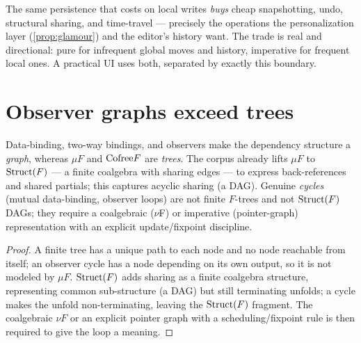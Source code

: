 \documentclass[../uxoxo-main]{subfiles}
\begin{document}
\begin{remark}\label{rem:valuewins}
The same persistence that costs on local writes \emph{buys} cheap snapshotting,
undo, structural sharing, and time-travel --- precisely the operations the
personalization layer (\cref{prop:glamour}) and the editor's history want. The
trade is real and directional: pure for infrequent global moves and history,
imperative for frequent local ones. A practical UI uses both, separated by exactly
this boundary.
\end{remark}

\section{Observer graphs exceed trees}\label{sec:graphs}
\begin{proposition}\label{prop:graphs}
Data-binding, two-way bindings, and observers make the dependency structure a
\emph{graph}, whereas $\mu F$ and $\mathrm{Cofree} F$ are \emph{trees}. The corpus already
lifts $\mu F$ to $\mathrm{Struct}(F)$ --- a finite coalgebra with sharing edges --- to
express back-references and shared partials; this captures acyclic sharing
(a DAG). Genuine \emph{cycles} (mutual data-binding, observer loops) are not
finite $F$-trees and not $\mathrm{Struct}(F)$ DAGs; they require a coalgebraic ($\nu$F)
or imperative (pointer-graph) representation with an explicit update/fixpoint
discipline.
\end{proposition}

\begin{proof}
A finite tree has a unique path to each node and no node reachable from itself; an
observer cycle has a node depending on its own output, so it is not modeled by
$\mu F$. $\mathrm{Struct}(F)$ adds sharing as a finite coalgebra structure, representing
common sub-structure (a DAG) but still terminating unfolds; a cycle makes the
unfold non-terminating, leaving the $\mathrm{Struct}(F)$ fragment. The coalgebraic $\nu F$
or an explicit pointer graph with a scheduling/fixpoint rule is then required to
give the loop a meaning.
\end{proof}

\end{document}
